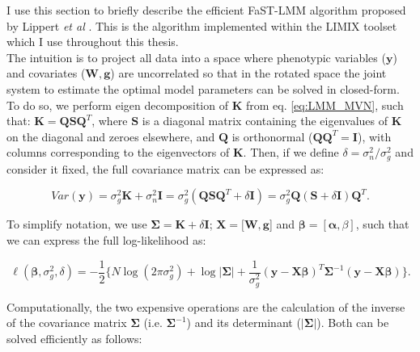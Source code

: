 \newpage

I use this section to  briefly describe the efficient FaST-LMM algorithm proposed by Lippert \textit{et al} \cite{lippert2011fast}.
This is the algorithm implemented within the LIMIX toolset \cite{lippert2014limix,casale2015efficient} which I use throughout this thesis.
\\

The intuition is to project all data into a space where phenotypic variables ($\mathbf{y}$) and covariates ($\mathbf{W}, \mathbf{g}$) are uncorrelated so that 
in the rotated 
space the joint system to estimate the optimal model parameters 
can be solved in closed-form.
To do so, we perform eigen decomposition of $\mathbf{K}$ from eq. \eqref{eq:LMM_MVN}, such that: $\mathbf{K} = \mathbf{Q}\mathbf{S}\mathbf{Q}^T$, where $\mathbf{S}$ is a diagonal matrix containing the eigenvalues of $\mathbf{K}$ on the diagonal and zeroes elsewhere, and $\mathbf{Q}$ is orthonormal ($\mathbf{Q}\mathbf{Q}^T = \mathbf{I}$), with columns corresponding to the eigenvectors of $\mathbf{K}$. 
Then, if we define $\delta = \sigma_n^2/\sigma_g^2$ and consider it fixed, the full covariance matrix can be expressed as:

\begin{equation}\label{eq:fast_lmm_full_covariance}
 Var(\mathbf{y}) = \sigma_g^2\mathbf{K} + \sigma_n^2\mathbf{I} = \sigma_g^2(\mathbf{Q}\mathbf{S}\mathbf{Q}^T + \delta\mathbf{I})= \sigma_g^2\mathbf{Q} (\mathbf{S} + \delta\mathbf{I})\mathbf{Q}^T.
\end{equation}

\vspace{4mm}

To simplify notation, we use $\boldsymbol{\Sigma} = \mathbf{K} + \delta\mathbf{I}$; $\mathbf{X} = [\mathbf{W}, \mathbf{g}$] and $\boldsymbol{\beta} = [\boldsymbol{\alpha}, \beta]$, such that we can express the full log-likelihood as:

\begin{equation} \label{eq:fast_lmm_log_likelihood}
 \ell(\boldsymbol{\beta}, \sigma_g^2, \delta) = -\frac{1}{2} \bigg\{N\log(2\pi\sigma_g^2) + \log{|\boldsymbol{\Sigma}|}+ \frac{1}{\sigma_g^2}(\mathbf{y}-\mathbf{X}\boldsymbol{\beta})^T\boldsymbol{\Sigma}^{-1}(\mathbf{y}-\mathbf{X}\boldsymbol{\beta}) \bigg\}. 
\end{equation}

Computationally, the two expensive operations are the calculation of the inverse of the covariance matrix $\boldsymbol{\Sigma}$ (i.e. $\boldsymbol{\Sigma}^{-1}$) and its determinant ($|\boldsymbol{\Sigma}|$). 
Both can be solved efficiently as follows:  

